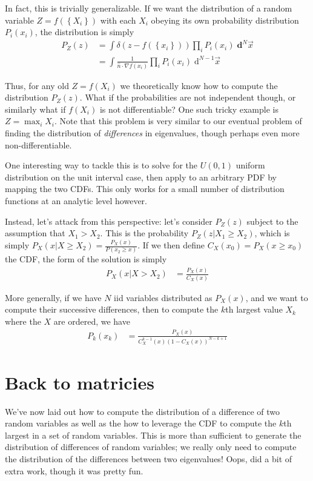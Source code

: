 \documentclass[12pt]{report}
\begin{document}
In fact, this is trivially generalizable. If we want the distribution of a
random variable $Z = f\left(\left\{ X_i \right\}\right)$ with each $X_i$ obeying
its own probability distribution $P_i(x_i)$, the distribution is simply
\begin{align}
    P_Z(z) &= \int \delta\left(z - f\left( \left\{ x_i \right\} \right)\right)
        \prod_i P_i(x_i)\;\mathbf{d}^N\vec{x}\\
    &= \int \frac{1}{\hat{n} \cdot \nabla f(x_i)}\prod_i P_i(x_i)\;
        \mathrm{d}^{N-1}\vec{x}
\end{align}

Thus, for any old $Z = f(X_i)$ we theoretically know how to compute the
distribution $P_Z(z)$. What if the probabilities are not independent though, or
similarly what if $f(X_i)$ is not differentiable? One such tricky example is $Z
= \max_i X_i$. Note that this problem is very similar to our eventual problem of
finding the distribution of \emph{differences} in eigenvalues, though perhaps
even more non-differentiable.

One interesting way to tackle this is to solve for the $U(0,1)$ uniform
distribution on the unit interval case, then apply to an arbitrary PDF by
mapping the two CDFs. This only works for a small number of distribution
functions at an analytic level however.

Instead, let's attack from this perspective: let's consider $P_Z(z)$ subject to
the assumption that $X_1 > X_2$. This is the probability $P_Z(z | X_1 \geq
X_2)$, which is simply $P_X(x | X \geq X_2) = \frac{P_X(x)}{P(x_2 \geq x)}$. If
we then define $C_X(x_0) = P_X(x \geq x_0)$ the CDF, the form of the solution is
simply
\begin{align}
    P_X(x | X > X_2) &= \frac{P_X(x)}{C_X(x)}
\end{align}

More generally, if we have $N$ iid variables distributed as $P_X(x)$, and we
want to compute their successive differences, then to compute the $k$th
largest value $X_k$ where the $X$ are ordered, we have
\begin{align}
    P_k(x_k) &= \frac{P_X(x)}{C_X^{k-1}(x)\left( 1-C_X(x) \right)^{N-k+1}}
\end{align}

\section{Back to matricies}

We've now laid out how to compute the distribution of a difference of two random
variables as well as the how to leverage the CDF to compute the $k$th largest
in a set of random variables. This is more than sufficient to generate the
distribution of differences of random variables; we really only need to compute
the distribution of the differences between two eigenvalues! Oops, did a bit of
extra work, though it was pretty fun.
\end{document}

